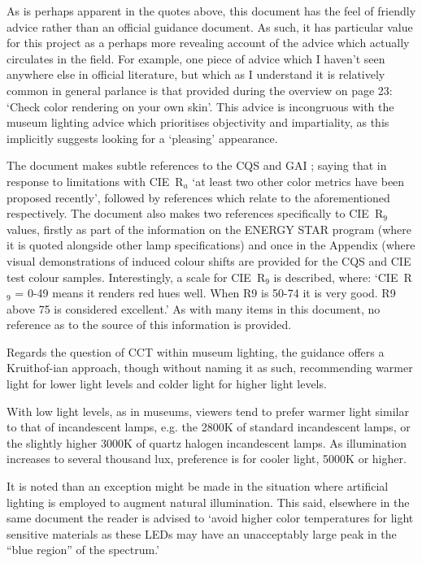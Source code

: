 As is perhaps apparent in the quotes above, this document has the feel of friendly advice rather than an official guidance document. As such, it has particular value for this project as a perhaps more revealing account of the advice which actually circulates in the field. For example, one piece of advice which I haven't seen anywhere else in official literature, but which as I understand it is relatively common in general parlance is that provided during the overview on page 23: `Check color rendering on your own skin'. This advice is incongruous with the museum lighting advice which prioritises objectivity and impartiality, as this implicitly suggests looking for a `pleasing' appearance.

The document makes subtle references to the \gls{CQS} \citep{ohno_rationale_2010,baier_is_2012,davis_toward_2005,davis_color_2010} and \gls{GAI} \citep{rea_color_2008}; saying that in response to limitations with \gls{CIE}~R$_a$ `at least two other color metrics have been proposed recently', followed by references which relate to the aforementioned respectively. The document also makes two references specifically to \gls{CIE}~R$_9$ values, firstly as part of the information on the ENERGY STAR program (where it is quoted alongside other lamp specifications) and once in the Appendix (where visual demonstrations of induced colour shifts are provided for the \gls{CQS} and \gls{CIE} test colour samples. Interestingly, a scale for \gls{CIE}~R$_9$ is described, where: `\gls{CIE}~R$_9$ = 0-49 means it renders red hues well. When R9 is 50-74 it is very good. R9 above 75 is considered excellent.' As with many items in this document, no reference as to the source of this information is provided. 

Regards the question of CCT within museum lighting, the guidance offers a Kruithof-ian approach, though without naming it as such, recommending warmer light for lower light levels and colder light for higher light levels. 

\begin{itquote}{}
With low light levels, as in museums, viewers tend to prefer warmer light similar to that of incandescent lamps, e.g. the 2800K of standard incandescent lamps, or the slightly higher 3000K of quartz halogen incandescent lamps. As illumination increases to several thousand lux, preference is for cooler light, 5000K or higher.
\end{itquote}

It is noted than an exception might be made in the situation where artificial lighting is employed to augment natural illumination. This said, elsewhere in the same document the reader is advised to `avoid higher color temperatures for light sensitive materials as these LEDs may have an unacceptably large peak in the ``blue region'' of the spectrum.'

